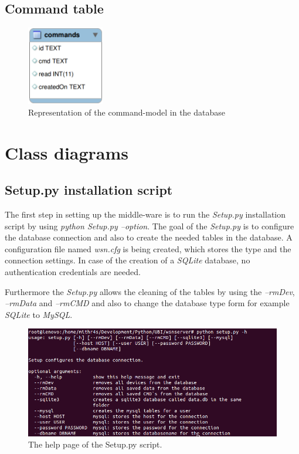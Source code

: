 \newpage
\subsection{Command table}
\begin{figure}[H]
	\centering
	\includegraphics[width=0.3\textwidth]{pic/DatamodelCMD.png}%
    \caption{Representation of the command-model in the database}
    \label{DatamodelCMDpic}%
\end{figure}

\newpage
\section{Class diagrams}
\subsection{Setup.py installation script}
The first step in setting up the middle-ware is to run the \textit{Setup.py} installation script by using \textit{python Setup.py --option}. The goal of the \textit{Setup.py} is to configure the database connection and also to create the needed tables in the database. A configuration file named \textit{wsn.cfg} is being created, which stores the type and the connection settings. In case of the creation of a \textit{SQLite} database, no authentication credentials are needed.

Furthermore the \textit{Setup.py} allows the cleaning of the tables by using the \textit{--rmDev},  \textit{--rmData} and \textit{--rmCMD} and also to change the database type form for example \textit{SQLite} to \textit{MySQL}.

\begin{figure}[H]
	\centering
	\includegraphics[width=1.0\textwidth]{pic/Setuppy.png}%
    \caption{The help page of the Setup.py script.}
    \label{Setuppypic}%
\end{figure}

